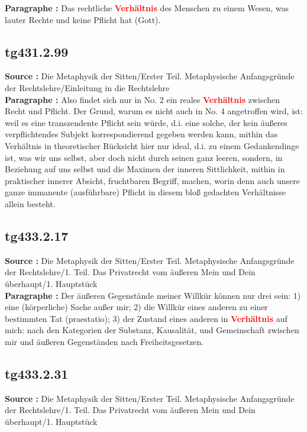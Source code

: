 \documentclass[a4paper,12pt,twoside]{book}
\newcommand{\match}[1]{\textcolor{red}{\textbf{#1}}}
\begin{document}
	\textbf{Paragraphe : }Das rechtliche \match{Verhältnis} des Menschen zu einem Wesen, was lauter Rechte und keine Pflicht hat (Gott). 
	
	\subsection*{tg431.2.99} 
	\textbf{Source : }Die Metaphysik der Sitten/Erster Teil. Metaphysische Anfangsgründe der Rechtslehre/Einleitung in die Rechtslehre\\  
	
	\textbf{Paragraphe : }Also findet sich nur in No. 2 ein reales \match{Verhältnis} zwischen Recht und Pflicht. Der Grund, warum es nicht auch in No. 4 angetroffen wird, ist: weil es eine transzendente
	Pflicht sein würde, d.i. eine solche, der kein äußeres verpflichtendes Subjekt korrespondierend gegeben werden kann, mithin das Verhältnis in theoretischer Rücksicht hier nur ideal, d.i. zu einem Gedankendinge ist, was wir uns selbst, aber doch nicht durch seinen ganz leeren, sondern, in Beziehung auf uns selbst und die Maximen der inneren Sittlichkeit, mithin in praktischer innerer Absicht, fruchtbaren Begriff, machen, worin denn auch unsere ganze immanente (ausführbare) Pflicht in diesem bloß gedachten Verhältnisse allein besteht. 
	
	\subsection*{tg433.2.17} 
	\textbf{Source : }Die Metaphysik der Sitten/Erster Teil. Metaphysische Anfangsgründe der Rechtslehre/1. Teil. Das Privatrecht vom äußeren Mein und Dein überhaupt/1. Hauptstück\\  
	
	\textbf{Paragraphe : }Der äußeren Gegenstände meiner Willkür können nur drei sein: 1) eine (körperliche) Sache außer mir; 2) die Willkür eines anderen zu einer bestimmten Tat (praestatio); 3) der Zustand eines anderen in \match{Verhältnis} auf mich: nach den Kategorien der Substanz, Kausalität, und Gemeinschaft zwischen mir und äußeren Gegenständen nach Freiheitsgesetzen. 
	
	\subsection*{tg433.2.31} 
	\textbf{Source : }Die Metaphysik der Sitten/Erster Teil. Metaphysische Anfangsgründe der Rechtslehre/1. Teil. Das Privatrecht vom äußeren Mein und Dein überhaupt/1. Hauptstück\\  
	
\end{document}
